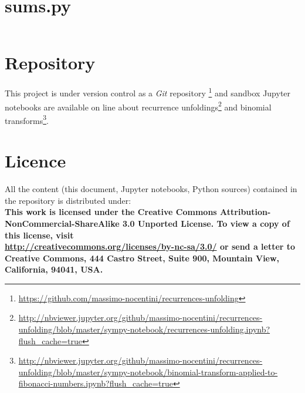 \documentclass[a4paper,dottedtoc,headinclude,footinclude]{report} %
\theoremstyle{plain}
\begin{document}
    \section{sums.py}

    \begin{adjustwidth}{-4cm}{0cm}
        \inputminted{python}{../sympy-notebook/sums.py}
    \end{adjustwidth}
    
    \section{Repository}

    This project is under version control as a \emph{Git} repository
    \footnote{\url{https://github.com/massimo-nocentini/recurrences-unfolding}}
    and sandbox Jupyter notebooks are available on line about recurrence
    unfoldings\footnote{\url{http://nbviewer.jupyter.org/github/massimo-nocentini/recurrences-unfolding/blob/master/sympy-notebook/recurrences-unfolding.ipynb?flush_cache=true}} 
    and binomial transforms\footnote{\url{http://nbviewer.jupyter.org/github/massimo-nocentini/recurrences-unfolding/blob/master/sympy-notebook/binomial-transform-applied-to-fibonacci-numbers.ipynb?flush_cache=true}}.


    \section{Licence}

    All the content (this document, Jupyter notebooks, Python sources) 
    contained in the repository is distributed under:\\
    \textbf{
    This work is licensed under the Creative Commons
    Attribution-NonCommercial-ShareAlike 3.0 Unported License. To view a copy of 
    this license, visit
    \\\url{http://creativecommons.org/licenses/by-nc-sa/3.0/}  or send a
    letter to Creative Commons, 444 Castro Street, Suite 900, Mountain View, 
    California, 94041, USA.} 
\end{document}
